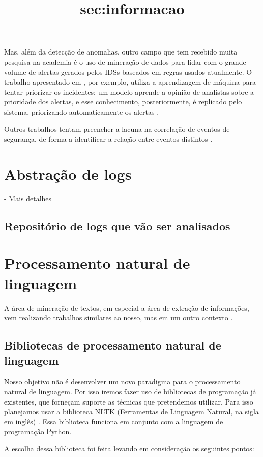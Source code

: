 \documentclass[
	12pt,				%
	openright,			%
	twoside,			%
	a4paper,			%
	english,			%
	french,				%
	spanish,			%
	brazil,				%
	]{abntex2}
\begin{document}
Mas, além da detecção de anomalias, outro campo que tem recebido muita pesquisa na academia é o uso de mineração de dados para lidar com o grande volume de alertas gerados pelos IDSs baseados em regras usados atualmente. O trabalho apresentado em \cite{zomlot2013aiding}, por exemplo, utiliza a aprendizagem de máquina para tentar priorizar os incidentes: um modelo aprende a opinião de analistas sobre a prioridade dos alertas, e esse conhecimento, posteriormente, é replicado pelo sistema, priorizando automaticamente os alertas .

Outros trabalhos tentam preencher a lacuna na correlação de eventos de segurança, de forma a identificar a relação entre eventos distintos \cite{smith2008using, stroeh2013approach}.

\section{Abstração de logs}\title{sec:informacao}
- Mais detalhes

\subsection{Repositório de logs que vão ser analisados}

\section{Processamento natural de linguagem}

A área de mineração de textos, em especial a área de extração de informações, vem realizando trabalhos similares ao nosso, mas em um outro contexto \cite{duque2012processo, matos2010environment}.

\subsection{Bibliotecas de processamento natural de linguagem}

Nosso objetivo não é desenvolver um novo paradigma para o processamento natural de linguagem. Por isso iremos fazer uso de bibliotecas de programação já existentes, que forneçam suporte as técnicas que pretendemos utilizar. Para isso planejamos usar a biblioteca NLTK (Ferramentas de Linguagem Natural, na sigla em inglês) \cite{bird2009natural}. Essa biblioteca funciona em conjunto com a linguagem de programação Python.

A escolha dessa biblioteca foi feita levando em consideração os seguintes pontos:
\end{document}
